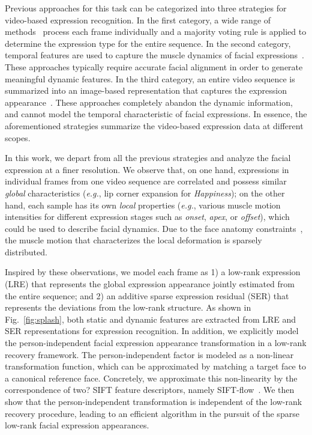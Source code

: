 \documentclass[journal]{IEEEtran}
\begin{document}
Previous approaches for this task can be categorized into three strategies for video-based expression recognition. In the first category, a wide range of methods~\cite{Bartlett_FG11,Valstar_SMCB12} process each frame individually and a majority voting rule is applied to determine the expression type for the entire sequence. In the second category, temporal features are used to capture the muscle dynamics of facial expressions~\cite{Zhao_PAMI07,Huang11}. These approaches typically require accurate facial alignment in order to generate meaningful dynamic features. In the third category, an entire video sequence is summarized into an image-based representation that captures the expression appearance~\cite{Yang_SMCB12,Dahmane_TMM14}. These approaches completely abandon the dynamic information, and cannot model the temporal characteristic of facial expressions. In essence, the aforementioned strategies summarize the video-based expression data at different scopes. 

In this work, we depart from all the previous strategies and analyze the facial expression at a finer resolution. We observe that, on one hand, expressions in individual frames from one video sequence are correlated and possess similar \textit{global} characteristics (\textit{e.g.}, lip corner expansion for \textit{Happiness}); on the other hand, each sample has its own \textit{local} properties (\textit{e.g.}, various muscle motion intensities for different expression stages such as \textit{onset}, \textit{apex}, or \textit{offset}), which could be used to describe facial dynamics. Due to the face anatomy constraints~\cite{Ekman78}, the muscle motion that characterizes the local deformation is sparsely distributed. 

Inspired by these observations, we model each frame as 1) a low-rank expression (LRE) that represents the global expression appearance jointly estimated from the entire sequence; and 2) an additive sparse expression residual (SER) that represents the deviations from the low-rank structure. As shown in Fig.~\ref{fig:splash}, both static and dynamic features are extracted from LRE and SER representations for expression recognition. In addition, we explicitly model the person-independent facial expression appearance transformation in a low-rank recovery framework. The person-independent factor is modeled as a non-linear transformation function, which can be approximated by matching a target face to a canonical reference face. Concretely, we approximate this non-linearity by the correspondence of \textcolor[rgb]{1,0,0}{two?} SIFT feature descriptors, namely SIFT-flow~\cite{Liu_PAMI11}. We then show that the person-independent transformation is independent of the low-rank recovery procedure, leading to an efficient algorithm in the pursuit of the sparse low-rank facial expression appearances. 
\end{document}
